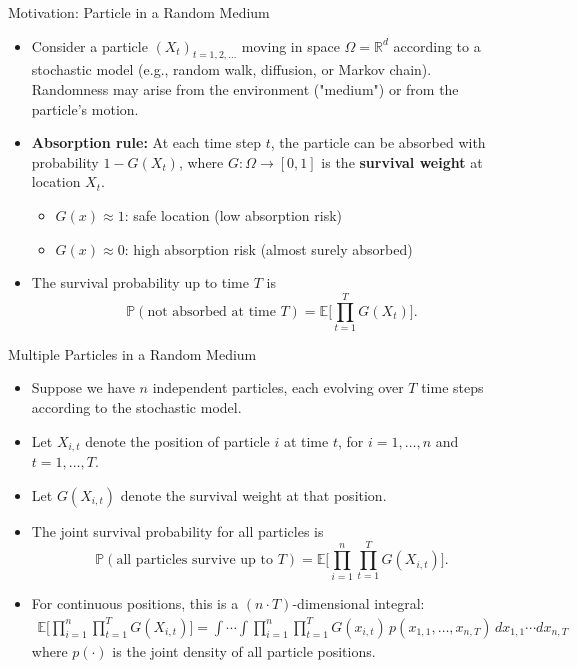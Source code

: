 \documentclass[8pt]{beamer}
\begin{document}
\begin{frame}[fragile]{Motivation: Particle in a Random Medium}
\begin{itemize}
    \item Consider a particle $(X_t)_{t=1,2,\dots}$ moving in space $\Omega = \mathbb{R}^d$ according to a stochastic model (e.g., random walk, diffusion, or Markov chain). Randomness may arise from the environment ("medium") or from the particle's motion.
    \item \textbf{Absorption rule:} At each time step $t$, the particle can be absorbed with probability $1 - G(X_t)$, where $G: \Omega \to [0,1]$ is the \textbf{survival weight} at location $X_t$.
    \begin{itemize}
        \item $G(x) \approx 1$: safe location (low absorption risk)
        \item $G(x) \approx 0$: high absorption risk (almost surely absorbed)
    \end{itemize}
    \item The survival probability up to time $T$ is
    \begin{equation*}
        \mathbb{P}(\text{not absorbed at time } T) 
        = \mathbb{E}\Big[ \prod_{t=1}^{T} G(X_t) \Big].
    \end{equation*}
\end{itemize}
\end{frame}

\begin{frame}[fragile]{Multiple Particles in a Random Medium}
\begin{itemize}
    \item Suppose we have $n$ independent particles, each evolving over $T$ time steps according to the stochastic model.
    \item Let $X_{i,t}$ denote the position of particle $i$ at time $t$, for $i = 1,\dots,n$ and $t = 1,\dots,T$.
    \item Let $G(X_{i,t})$ denote the survival weight at that position.
    \item The joint survival probability for all particles is
    \begin{equation*}
        \mathbb{P}(\text{all particles survive up to } T)
        = \mathbb{E}\Big[ \prod_{i=1}^{n} \prod_{t=1}^{T} G(X_{i,t}) \Big].
    \end{equation*}
    \item For continuous positions, this is a $(n \cdot T)$-dimensional integral:
    \begin{align*}
        \mathbb{E}\Big[ \prod_{i=1}^{n} \prod_{t=1}^{T} G(X_{i,t}) \Big] 
        = \int \cdots \int \prod_{i=1}^{n} \prod_{t=1}^{T} G(x_{i,t})
        \, p(x_{1,1},\dots,x_{n,T}) \, dx_{1,1} \cdots dx_{n,T}
    \end{align*}
    where $p(\cdot)$ is the joint density of all particle positions.
\end{itemize}
\end{frame}
\end{document}
